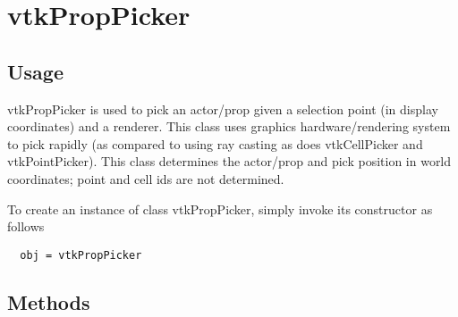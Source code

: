 \section{vtkPropPicker}

\subsection{Usage}

 vtkPropPicker is used to pick an actor/prop given a selection
 point (in display coordinates) and a renderer. This class uses
 graphics hardware/rendering system to pick rapidly (as compared
 to using ray casting as does vtkCellPicker and vtkPointPicker).
 This class determines the actor/prop and pick position in world
 coordinates; point and cell ids are not determined.

To create an instance of class vtkPropPicker, simply
invoke its constructor as follows
\begin{verbatim}
  obj = vtkPropPicker
\end{verbatim}
\subsection{Methods}

